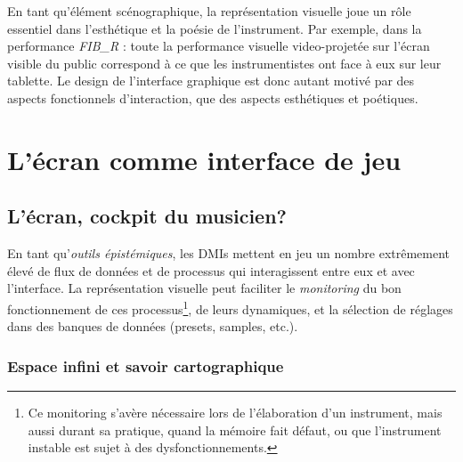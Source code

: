 \noindent En tant qu'élément scénographique, la représentation visuelle joue un rôle essentiel dans l'esthétique et la poésie de l'instrument. Par exemple, dans la performance \textit{FIB\_R} : toute la performance visuelle video-projetée sur l'écran visible du public correspond à ce que les instrumentistes ont face à eux sur leur tablette. Le design de l'interface graphique est donc autant motivé par des aspects fonctionnels d'interaction, que des aspects esthétiques et poétiques.


\section{L'écran comme interface de jeu}

\subsection{L'écran, cockpit du musicien?}

\noindent En tant qu'\textit{outils épistémiques}, les \glspl{DMI} mettent en jeu un nombre extrêmement élevé de flux de données et de processus qui interagissent entre eux et avec l'interface. La représentation visuelle peut faciliter le \textit{monitoring} du bon fonctionnement de ces processus\footnote{Ce monitoring s'avère nécessaire lors de l'élaboration d'un instrument, mais aussi durant sa pratique, quand la mémoire fait défaut, ou que l'instrument instable est sujet à des dysfonctionnements.}, de leurs dynamiques, et la sélection de réglages dans des banques de données (presets, samples, etc.).

\subsubsection{Espace infini et savoir cartographique} 

